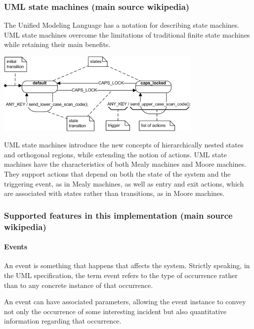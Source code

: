 \subsubsection*{U\+ML state machines (main source wikipedia)}

The Unified Modeling Language has a notation for describing state machines. U\+ML state machines overcome the limitations of traditional finite state machines while retaining their main benefits.

 
\begin{DoxyImage}
\includegraphics[width=10cm]{basic_uml_state_chart.png}
\caption{Basic U\+ML state chart}
\end{DoxyImage}


U\+ML state machines introduce the new concepts of hierarchically nested states and orthogonal regions, while extending the notion of actions. U\+ML state machines have the characteristics of both Mealy machines and Moore machines. They support actions that depend on both the state of the system and the triggering event, as in Mealy machines, as well as entry and exit actions, which are associated with states rather than transitions, as in Moore machines.

\subsubsection*{Supported features in this implementation (main source wikipedia)}

\paragraph*{Events}

An event is something that happens that affects the system. Strictly speaking, in the U\+ML specification, the term event refers to the type of occurrence rather than to any concrete instance of that occurrence.

An event can have associated parameters, allowing the event instance to convey not only the occurrence of some interesting incident but also quantitative information regarding that occurrence.

